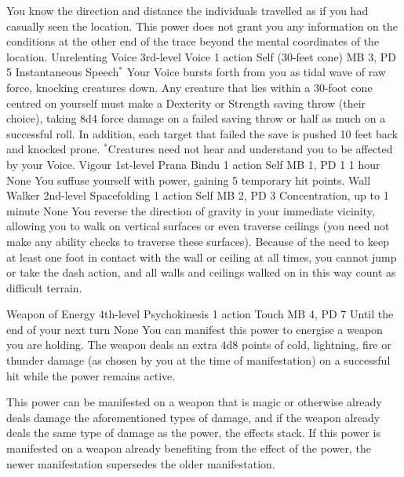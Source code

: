 You know the direction and distance the individuals travelled
as if you had casually seen the location. This power does
not grant you any information on the conditions at the other
end of the trace beyond the mental coordinates of the location.
\DndPowerHeader%
    {Unrelenting Voice\label{pwr:unrelenting_voice}}
    {3rd-level Voice}
    {1 action}
    {Self (30-feet cone)}
    {MB 3, PD 5}
    {Instantaneous}
    {Speech$^*$}
Your Voice bursts forth from you as tidal
wave of raw force, knocking creatures down. Any creature that
lies within a 30-foot cone centred on yourself must make a
Dexterity or Strength saving throw (their choice), taking
8d4 force damage on a failed saving throw or half as much
on a successful roll. In addition, each target that failed
the save is pushed 10 feet back and knocked prone.
$^*$Creatures need not hear and understand you to be
affected by your Voice.
\DndPowerHeader%
    {Vigour\label{pwr:vigour}}
    {1st-level Prana Bindu}
    {1 action}
    {Self}
    {MB 1, PD 1}
    {1 hour}
    {None}
You suffuse yourself with power, gaining
5 temporary hit points.
\DndPowerHeader%
    {Wall Walker\label{pwr:wall_walker}}
    {2nd-level Spacefolding}
    {1 action}
    {Self}
    {MB 2, PD 3}
    {Concentration, up to 1 minute}
    {None}
You reverse the direction of gravity in your
immediate vicinity, allowing you to walk on vertical surfaces
or even traverse ceilings (you need not make any ability checks
to traverse these surfaces). Because of the need to keep at
least one foot in contact with the wall or ceiling at all
times, you cannot jump or take the dash action, and all walls
and ceilings walked on in this way count as difficult terrain.

\DndPowerHeader%
    {Weapon of Energy\label{pwr:weapon_of_energy}}
    {4th-level Psychokinesis}
    {1 action}
    {Touch}
    {MB 4, PD 7}
    {Until the end of your next turn}
    {None}
You can manifest this power to energise a
weapon you are holding. The weapon deals an extra 4d8 points
of cold, lightning, fire or thunder damage (as chosen by you
at the time of manifestation) on a successful hit
while the power remains active.

This power can be manifested on a weapon that is magic or
otherwise already deals damage the aforementioned types of
damage, and if the weapon already deals the same type of damage
as the power, the effects stack. If this power is manifested
on a weapon already benefiting from the effect of the power,
the newer manifestation supersedes the older manifestation.

